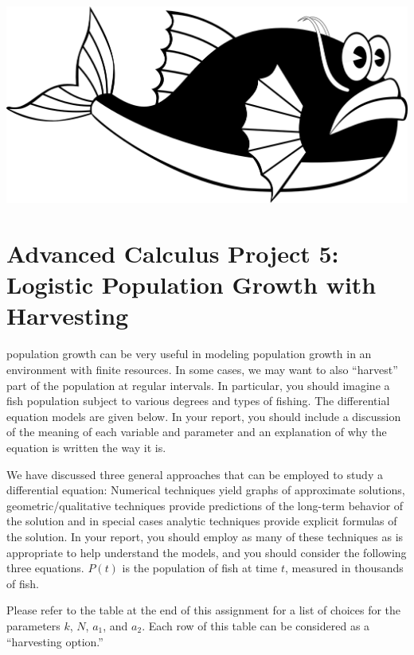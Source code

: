 \documentclass
[justified,nohyper]
{tufte-handout}
\begin{document}
\includegraphics[scale=0.3]{fish.png}
\section{Advanced Calculus Project 5: Logistic Population Growth with Harvesting}

 population growth can be very useful in modeling population growth in 
an environment with finite resources. In some cases, we may want to also ``harvest'' part of the 
population at regular intervals. In particular, you should imagine a fish population subject to 
various degrees and types of fishing. The differential equation models are given below. In your 
report, you should include a discussion of the meaning of each variable and parameter and an 
explanation of why the equation is written the way it is.

We have discussed three general approaches that can be employed to study a differential equation: 
Numerical techniques yield graphs of approximate solutions, geometric/qualitative techniques provide 
predictions of the long-term behavior of the solution and in special cases analytic techniques provide 
explicit formulas of the solution. In your report, you should employ as many of these techniques as is 
appropriate to help understand the models, and you should consider the following three equations.
$P(t)$ is the population of fish at time $t$, measured in thousands of fish.

Please refer to the table at the end of this assignment for a list of choices for the parameters $k$, 
$N$, $a_1$, and $a_2$. Each row of this table can be considered as a ``harvesting option.''
\end{document}
